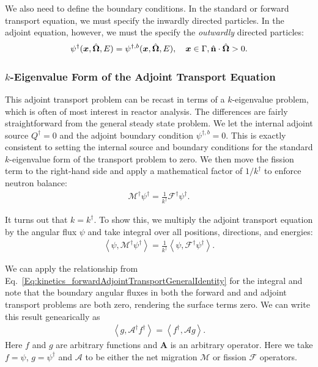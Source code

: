 We also need to define the boundary conditions. In the standard or forward transport equation, we must specify the inwardly directed particles. In the adjoint equation, however, we must the specify the \emph{outwardly} directed particles:
\begin{align}
  \psi^\dagger(\bm{x},\hat{\mathbf{\Omega}},E) = \psi^{\dagger,b}(\bm{x},\hat{\mathbf{\Omega}},E), \quad \bm{x} \in \Gamma, \hat{\mathbf{n}} \cdot \hat{\mathbf{\Omega}} > 0 .
\end{align}

\subsubsection{$k$-Eigenvalue Form of the Adjoint Transport Equation}

This adjoint transport problem can be recast in terms of a $k$-eigenvalue problem, which is often of most interest in reactor analysis. The differences are fairly straightforward from the general steady state problem. We let the internal adjoint source $Q^\dagger = 0$ and the adjoint boundary condition $\psi^{\dagger,b} = 0$. This is exactly consistent to setting the internal source and boundary conditions for the standard $k$-eigenvalue form of the transport problem to zero. We then move the fission term to the right-hand side and apply a mathematical factor of $1/k^\dagger$ to enforce neutron balance:
\begin{align}
  \mathcal{M}^\dagger \psi^\dagger = \frac{1}{k^\dagger} \mathcal{F}^\dagger \psi^\dagger .
\end{align}

It turns out that $k = k^\dagger$. To show this, we multiply the adjoint transport equation by the angular flux $\psi$ and take integral over all positions, directions, and energies:
\begin{align}
  \left< \psi, \mathcal{M}^\dagger \psi^\dagger \right>  = \frac{1}{k^\dagger} \left< \psi, \mathcal{F}^\dagger \psi^\dagger \right> .
\end{align}

We can apply the relationship from Eq.~\eqref{Eq:kinetics_forwardAdjointTransportGeneralIdentity} for the integral and note that the boundary angular fluxes in both the forward and and adjoint transport problems are both zero, rendering the surface terms zero. We can write this result genearically as
\begin{align}
  \left< g , \mathcal{A}^\dagger f^\dagger \right> = \left< f^\dagger, \mathcal{A} g \right> . \label{Eq:kinetics_forwardAdjointNoBoundaryIdentity}
\end{align}
Here $f$ and $g$ are arbitrary functions and $\mathbf{A}$ is an arbitrary operator. Here we take $f = \psi$, $g = \psi^\dagger$ and $\mathcal{A}$ to be either the net migration $\mathcal{M}$ or fission $\mathcal{F}$ operators.

